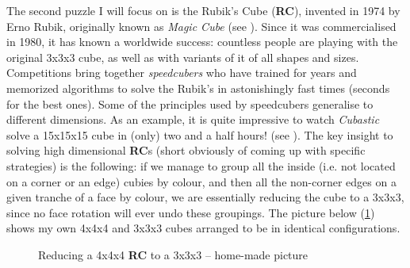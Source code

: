 The second puzzle I will focus on is the Rubik's Cube (\textbf{RC}), invented in 1974 by Erno Rubik, originally known as \textit{Magic Cube} (see \cite{RubiksWiki}). Since it was commercialised in 1980, it has known a worldwide success: countless people are playing with the original 3x3x3 cube, as well as with variants of it of all shapes and sizes. Competitions bring together \textit{speedcubers} who have trained for years and memorized algorithms to solve the Rubik's in astonishingly fast times (seconds for the best ones). Some of the principles used by speedcubers generalise to different dimensions. As an example, it is quite impressive to watch \textit{Cubastic} solve a 15x15x15 cube in (only) two and a half hours! (see \cite{151515Rubiks}). The key insight to solving high dimensional \textbf{RC}s (short obviously of coming up with specific strategies) is the following: if we manage to group all the inside (i.e. not located on a corner or an edge) cubies by colour, and then all the non-corner edges on a given tranche of a face by colour, we are essentially reducing the cube to a 3x3x3, since no face rotation will ever undo these groupings. The picture below (\ref{fig:4442333}) shows my own 4x4x4 and 3x3x3 cubes arranged to be in identical configurations.
\begin{figure}[H]
  \noindent
  \caption[Reducing RC]{Reducing a 4x4x4 \textbf{RC} to a 3x3x3 -- home-made picture}
  \label{fig:4442333}
\end{figure}
